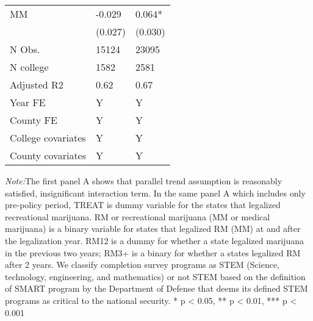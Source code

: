 \documentclass[12pt]{article}%
\begin{document}
\begin{table}
\begin{threeparttable}
\begin{tabular}{lll}
MM & -0.029 & 0.064* \\
& (0.027) & (0.030) \\
\cline{2-3} 
N Obs. & 15124 & 23095 \\
N college & 1582 & 2581 \\
Adjusted R2 & 0.62 & 0.67 \\
\midrule
Year FE & Y & Y \\
County FE & Y & Y \\
College covariates & Y & Y \\
County covariates & Y & Y \\
\bottomrule
\end{tabular}
  \end{threeparttable}
 
\end{table}
\FloatBarrier

\textit{Note:}The first panel A shows that parallel trend assumption is reasonably satisfied, insignificant interaction term. In the same panel A which includes only pre-policy period, TREAT is dummy variable for the states that legalized recreational marijuana. RM or recreational marijuana (MM or medical marijuana) is a binary variable for states that legalized RM (MM) at and after the legalization year. RM12 is a dummy for whether a state legalized marijuana in the previous two years; RM3+ is a binary for whether a states legalized RM after 2 years. We classify completion survey programs as STEM (Science, technology, engineering, and mathematics) or not STEM based on the definition of SMART program by the Department of Defense that deems its defined STEM programs as critical to the national security.
* p \textless{} 0.05, ** p \textless{} 0.01, ***
p \textless{} 0.001
\end{document}
